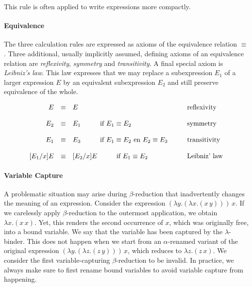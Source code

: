 This rule is often applied to write expressions more compactly.

\paragraph{Equivalence}
The three calculation rules are expressed as axioms of the equivalence relation
$\equiv$. Three additional, usually implicitly assumed, defining axioms of an equivalence relation
are 
\textit{reflexivity}, \textit{symmetry} and \textit{transitivity}. 
A final special axiom is \emph{Leibniz's law}. This law expresses that
we may replace a subexpression 
$E_1$ of a larger expression $E$ by an equivalent subexpression $E_2$ and still preserve
equivalence of the whole.
\begin{framed}
\begin{equation*}
\begin{array}{rcl@{\hspace{1cm}}l}
 E & \equiv  & E                    & \text{reflexivity} \\ \ \\[0cm] 
 E_2 & \equiv & E_1\hspace{1cm}\text{if }E_1 \equiv E_2 & \text{symmetry} \\ \ \\[0cm]
 E_1 & \equiv & E_3\hspace{1cm}\text{if }E_1 \equiv E_2\text{ en }E_2 \equiv E_3 & \text{transitivity} \\ \ \\[0cm]
 [{E_1}/x] E  & \equiv & [E_2/x]E  \hspace{1cm}\text{if }E_1 \equiv E_2     & \text{Leibniz' law}
\end{array}
\end{equation*}
\end{framed}

\paragraph{Variable Capture}
A problematic situation may arise during $\beta$-reduction that
inadvertently changes the meaning of an expression.
Consider the expression
$(\lambda y.(\lambda x.(x\,y)))\,x$. If we carelessly apply $\beta$-reduction
to the outermost application, we obtain $\lambda x.(x\,x)$. Yet, this renders
the second occurrence of $x$, which was originally free, into a bound variable.
We say that the variable has been captured by the $\lambda$-binder. This does
not happen when we start from an $\alpha$-renamed variant of the original
expression
$(\lambda y.(\lambda z.(z\,y)))\,x$, which reduces to
$\lambda z.(z\,x)$. 
We consider the first variable-capturing $\beta$-reduction to be invalid.
In practice, we always make sure to first rename bound variables to avoid
variable capture from happening.

